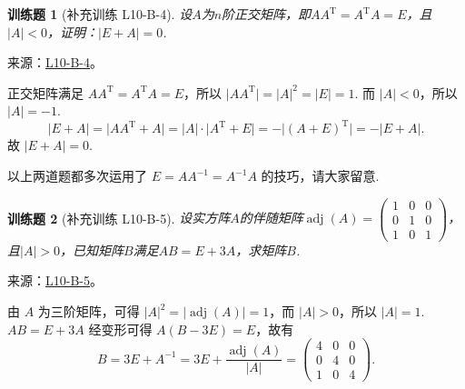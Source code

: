 \documentclass[12pt,fontset=fandol]{ctexart}
\newtheorem{exercise}{训练题}[section]
\begin{document}
\begin{exercise}[补充训练 L10-B-4]\label{prob:L10-B-4}
设$A$为$n$阶正交矩阵，即$AA^\mathrm{T}=A^\mathrm{T}A=E$，且$|A|<0$，证明：$|E+A|=0$.
\end{exercise}
\noindent 来源：\href{https://github.com/yhwu-is/Linear-Algebra-Left-Undone/blob/new/%E8%AE%B2%E4%B9%89/%E4%B8%93%E9%A2%98/10%20%E8%A1%8C%E5%88%97%E5%BC%8F.tex}{L10-B-4}。
\begin{solve}
正交矩阵满足 $AA^{\mathrm{T}} = A^{\mathrm{T}}A = E$，所以 $\lvert AA^{\mathrm{T}} \rvert = \lvert A \rvert^2 = \lvert E \rvert = 1$. 而 $\lvert A \rvert < 0$，所以 $\lvert A \rvert = -1$.
            \[\lvert E+A \rvert = \lvert AA^{\mathrm{T}}+A \rvert = \lvert A \rvert \cdot \lvert A^{\mathrm{T}}+E \rvert = -\lvert (A+E)^{\mathrm{T}} \rvert = -\lvert E+A \rvert.\]
            故 $\lvert E+A \rvert = 0$.

            以上两道题都多次运用了 $E = AA^{-1} = A^{-1}A$ 的技巧，请大家留意.
\end{solve}

\begin{exercise}[补充训练 L10-B-5]\label{prob:L10-B-5}
设实方阵$A$的伴随矩阵$\operatorname{adj}(A)=\begin{pmatrix}
                1 & 0 & 0 \\ 0 & 1 & 0 \\ 1 & 0 & 1
            \end{pmatrix}$，且$|A|>0$，已知矩阵$B$满足$AB=E+3A$，求矩阵$B$.
\end{exercise}
\noindent 来源：\href{https://github.com/yhwu-is/Linear-Algebra-Left-Undone/blob/new/%E8%AE%B2%E4%B9%89/%E4%B8%93%E9%A2%98/10%20%E8%A1%8C%E5%88%97%E5%BC%8F.tex}{L10-B-5}。
\begin{solve}
由 $A$ 为三阶矩阵，可得 $|A|^2 = |\operatorname{adj}(A)| = 1$，而 $|A|>0$，所以 $|A|=1$. $AB=E+3A$ 经变形可得 $A(B-3E) = E$，故有
            \[
                B = 3E + A^{-1} = 3E + \frac{\operatorname{adj}(A)}{|A|} = \begin{pmatrix}
                    4 & 0 & 0 \\ 0 & 4 & 0 \\ 1 & 0 & 4
                \end{pmatrix}.
            \]
\end{solve}
\end{document}
